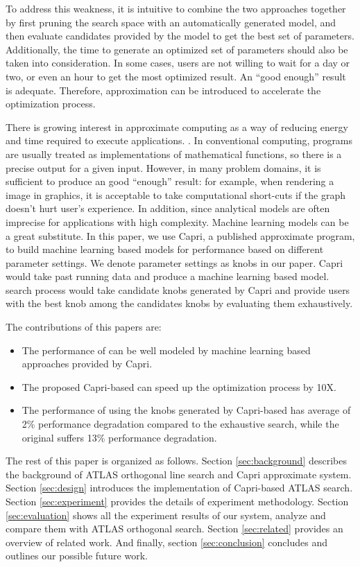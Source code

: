 \par
To address this weakness, it is intuitive to combine the two approaches together by first pruning the search
space with an automatically generated model, and then evaluate candidates
provided by the model to get the best set of parameters.
Additionally, the time to generate an optimized set of parameters
should also be taken into consideration. In some cases, users are not willing
to wait for a day or two, or even an hour to get the most optimized result. An
``good enough'' result is adequate. Therefore, approximation can be introduced
to accelerate the optimization process.

There is growing interest in approximate computing as a way of reducing energy
and time required to execute applications. \cite{ansel2011language,
baek2010green, sidiroglou2011managing, swaminathan2015case}. In conventional
computing, programs are usually treated as implementations of mathematical
functions, so there is a precise output for a given input.
However, in many problem domains, it is sufficient to produce an good ``enough''
result: for example, when rendering a image in graphics, it is
acceptable to take computational short-cuts if the graph doesn't hurt user's
experience. In addition, since analytical models are often imprecise for
applications with high complexity. Machine learning models can be a great
substitute. In this paper, we use Capri\cite{sui2016proactive}, a published
approximate program, to build machine learning based models for \gem performance
based on different parameter settings. We denote parameter settings as knobs in
our paper. Capri would take past \atl running data and produce a machine
learning based model. \atl search process would take candidate knobs generated
by Capri and provide users with the best knob among the candidates knobs by
evaluating them exhaustively.


The contributions of this papers are:
\begin{itemize}
\item The performance of \gem can be well modeled by machine learning based
approaches provided by Capri.
\item The proposed Capri-based \atl can speed up the optimization process by 10X.
\item The performance of \gem using the knobs generated by Capri-based \atl
has average of 2\% performance degradation compared to the exhaustive search,
while the original \atl suffers 13\% performance degradation.
\end{itemize}

\par
The rest of this paper is organized as follows. Section \ref{sec:background} describes the background of ATLAS
orthogonal line search and Capri approximate system.
Section \ref{sec:design} introduces the implementation of Capri-based ATLAS search.
Section \ref{sec:experiment} provides the details of experiment methodology.
Section \ref{sec:evaluation} shows all the experiment results of our system, analyze and compare them with ATLAS orthogonal search.
Section \ref{sec:related} provides an overview of related work.
And finally, section \ref{sec:conclusion} concludes and outlines our possible future work.
